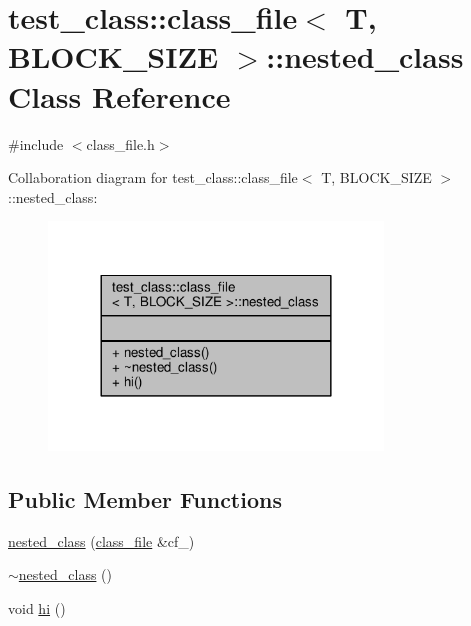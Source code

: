 \hypertarget{classtest__class_1_1class__file_1_1nested__class}{\section{test\-\_\-class\-:\-:class\-\_\-file$<$ T, B\-L\-O\-C\-K\-\_\-\-S\-I\-Z\-E $>$\-:\-:nested\-\_\-class Class Reference}
\label{classtest__class_1_1class__file_1_1nested__class}
}


{\ttfamily \#include $<$class\-\_\-file.\-h$>$}



Collaboration diagram for test\-\_\-class\-:\-:class\-\_\-file$<$ T, B\-L\-O\-C\-K\-\_\-\-S\-I\-Z\-E $>$\-:\-:nested\-\_\-class\-:\nopagebreak
\begin{figure}[H]
\begin{center}
\leavevmode
\includegraphics[width=252pt]{classtest__class_1_1class__file_1_1nested__class__coll__graph}
\end{center}
\end{figure}
\subsection*{Public Member Functions}
\begin{DoxyCompactItemize}
\item 
\hyperlink{classtest__class_1_1class__file_1_1nested__class_a159f445c4d8c68c30958e924151dd6ec}{nested\-\_\-class} (\hyperlink{classtest__class_1_1class__file}{class\-\_\-file} \&cf\-\_\-)
\item 
\hyperlink{classtest__class_1_1class__file_1_1nested__class_a83499df13480903814f21b3bd927d6f1}{$\sim$nested\-\_\-class} ()
\item 
void \hyperlink{classtest__class_1_1class__file_1_1nested__class_a85619047a341bd02a6215ab231b03933}{hi} ()
\end{DoxyCompactItemize}


